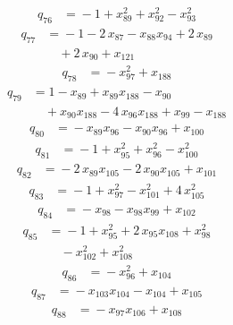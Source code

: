 \begin{align*}
q_{76} &={}-1 +x_{89}^{2} +x_{92}^{2} -x_{93}^{2}
\end{align*}
\begin{align*}
q_{77} &={}-1 -2\,x_{87} -x_{88}x_{94} +2\,x_{89}\\
&\quad +2\,x_{90} +x_{121}
\end{align*}
\begin{align*}
q_{78} &={}-x_{97}^{2} +x_{188}
\end{align*}
\begin{align*}
q_{79} &={}1 -x_{89} +x_{89}x_{188} -x_{90}\\
&\quad +x_{90}x_{188} -4\,x_{96}x_{188} +x_{99} -x_{188}
\end{align*}
\begin{align*}
q_{80} &={}-x_{89}x_{96} -x_{90}x_{96} +x_{100}
\end{align*}
\begin{align*}
q_{81} &={}-1 +x_{95}^{2} +x_{96}^{2} -x_{100}^{2}
\end{align*}
\begin{align*}
q_{82} &={}-2\,x_{89}x_{105} -2\,x_{90}x_{105} +x_{101}
\end{align*}
\begin{align*}
q_{83} &={}-1 +x_{97}^{2} -x_{101}^{2} +4\,x_{105}^{2}
\end{align*}
\begin{align*}
q_{84} &={}-x_{98} -x_{98}x_{99} +x_{102}
\end{align*}
\begin{align*}
q_{85} &={}-1 +x_{95}^{2} +2\,x_{95}x_{108} +x_{98}^{2}\\
&\quad -x_{102}^{2} +x_{108}^{2}
\end{align*}
\begin{align*}
q_{86} &={}-x_{96}^{2} +x_{104}
\end{align*}
\begin{align*}
q_{87} &={}-x_{103}x_{104} -x_{104} +x_{105}
\end{align*}
\begin{align*}
q_{88} &={}-x_{97}x_{106} +x_{108}
\end{align*}
